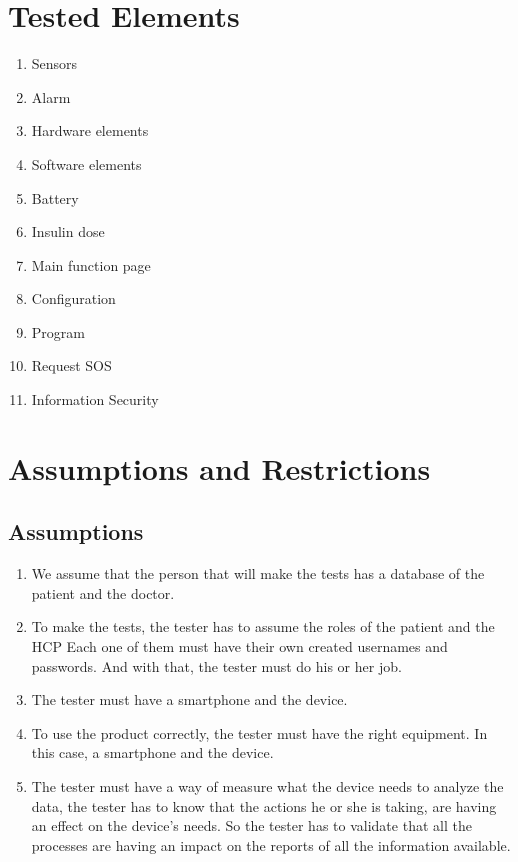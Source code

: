 \documentclass{scrreprt}
\begin{document}
\section{Tested Elements}
\begin{enumerate}
    \item Sensors
    \item Alarm
    \item Hardware elements
    \item Software elements
    \item Battery
    \item Insulin dose
    \item Main function page
    \item Configuration
    \item Program
    \item Request SOS
    \item Information Security
\end{enumerate}

\section{Assumptions and Restrictions}
\subsection{Assumptions}
\begin{enumerate}
    \item We assume that the person that will make the tests has a database of the patient and the doctor.
    \item To make the tests, the tester has to assume the roles of the patient and the HCP Each one of them must have their own created usernames and passwords. And with that, the tester must do his or her job.
    \item The tester must have a smartphone and the device.
    \item To use the product correctly, the tester must have the right equipment. In this case, a smartphone and the device.
    \item The tester must have a way of measure what the device needs to analyze the data, the tester has to know that the actions he or she is taking, are having an effect on the device’s needs. So the tester has to 
        validate that all the processes are having an impact on the reports of all the information available.                                                                                                                
\end{enumerate}
\end{document}
